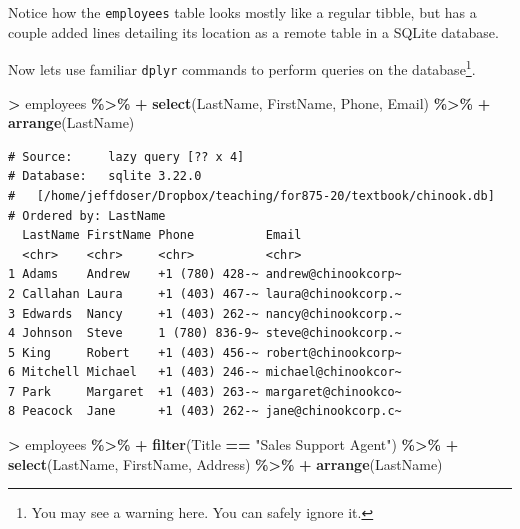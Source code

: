 \documentclass[
]{krantz}
\makeatletter
\newenvironment{Shaded}{\begin{snugshade}}{\end{snugshade}}
\newcommand{\KeywordTok}[1]{\textcolor[rgb]{0.27,0.27,0.27}{\textbf{#1}}}
\newcommand{\NormalTok}[1]{#1}
\newcommand{\OperatorTok}[1]{\textcolor[rgb]{0.43,0.43,0.43}{\textbf{#1}}}
\newcommand{\StringTok}[1]{\textcolor[rgb]{0.5,0.5,0.5}{#1}}
\newenvironment{kframe}{%
\medskip{}
\setlength{\fboxsep}{.8em}
 \def\at@end@of@kframe{}%
 \ifinner\ifhmode%
  \def\at@end@of@kframe{\end{minipage}}%
  \begin{minipage}{\columnwidth}%
 \fi\fi%
 \def\FrameCommand##1{\hskip\@totalleftmargin \hskip-\fboxsep
 \colorbox{shadecolor}{##1}\hskip-\fboxsep
     \hskip-\linewidth \hskip-\@totalleftmargin \hskip\columnwidth}%
 \MakeFramed {\advance\hsize-\width
   \@totalleftmargin\z@ \linewidth\hsize
   \@setminipage}}%
 {\par\unskip\endMakeFramed%
 \at@end@of@kframe}
\renewenvironment{Shaded}{\begin{kframe}}{\end{kframe}}
\makeatother
\begin{document}
Notice how the \texttt{employees} table looks mostly like a regular tibble, but has a couple added lines detailing its location as a remote table in a SQLite database.

Now lets use familiar \texttt{dplyr} commands to perform queries on the database\footnote{You may see a warning here. You can safely ignore it.}.

\begin{Shaded}
\begin{Highlighting}[]
\OperatorTok{\textgreater{}}\StringTok{ }\NormalTok{employees }\OperatorTok{\%\textgreater{}\%}\StringTok{ }
\OperatorTok{+}\StringTok{   }\KeywordTok{select}\NormalTok{(LastName, FirstName, Phone, Email) }\OperatorTok{\%\textgreater{}\%}\StringTok{ }
\OperatorTok{+}\StringTok{   }\KeywordTok{arrange}\NormalTok{(LastName)}
\end{Highlighting}
\end{Shaded}

\begin{verbatim}
# Source:     lazy query [?? x 4]
# Database:   sqlite 3.22.0
#   [/home/jeffdoser/Dropbox/teaching/for875-20/textbook/chinook.db]
# Ordered by: LastName
  LastName FirstName Phone          Email              
  <chr>    <chr>     <chr>          <chr>              
1 Adams    Andrew    +1 (780) 428-~ andrew@chinookcorp~
2 Callahan Laura     +1 (403) 467-~ laura@chinookcorp.~
3 Edwards  Nancy     +1 (403) 262-~ nancy@chinookcorp.~
4 Johnson  Steve     1 (780) 836-9~ steve@chinookcorp.~
5 King     Robert    +1 (403) 456-~ robert@chinookcorp~
6 Mitchell Michael   +1 (403) 246-~ michael@chinookcor~
7 Park     Margaret  +1 (403) 263-~ margaret@chinookco~
8 Peacock  Jane      +1 (403) 262-~ jane@chinookcorp.c~
\end{verbatim}

\begin{Shaded}
\begin{Highlighting}[]
\OperatorTok{\textgreater{}}\StringTok{ }\NormalTok{employees }\OperatorTok{\%\textgreater{}\%}\StringTok{ }
\OperatorTok{+}\StringTok{   }\KeywordTok{filter}\NormalTok{(Title }\OperatorTok{==}\StringTok{ "Sales Support Agent"}\NormalTok{) }\OperatorTok{\%\textgreater{}\%}\StringTok{ }
\OperatorTok{+}\StringTok{   }\KeywordTok{select}\NormalTok{(LastName, FirstName, Address) }\OperatorTok{\%\textgreater{}\%}\StringTok{ }
\OperatorTok{+}\StringTok{   }\KeywordTok{arrange}\NormalTok{(LastName)}
\end{Highlighting}
\end{Shaded}
\end{document}
